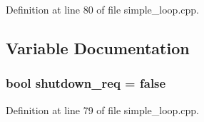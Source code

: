 \-Definition at line 80 of file simple\-\_\-loop.\-cpp.



\subsection{\-Variable \-Documentation}
\subsubsection[{shutdown\-\_\-req}]{\setlength{\rightskip}{0pt plus 5cm}bool {\bf shutdown\-\_\-req} = false}\label{simple__loop_8cpp_ad848ea54585ac98c0b4fc4c0fe4ef236}


\-Definition at line 79 of file simple\-\_\-loop.\-cpp.

